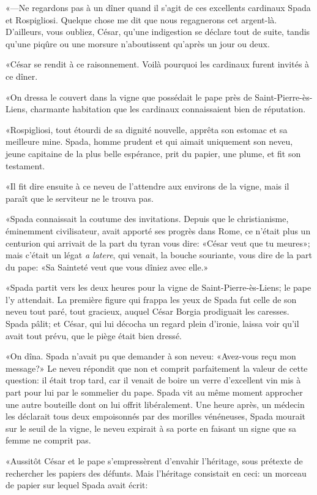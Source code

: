 «—Ne regardons pas à un dîner quand il s'agit de ces excellents cardinaux Spada et Rospigliosi. Quelque chose me dit que nous regagnerons cet argent-là. D'ailleurs, vous oubliez, César, qu'une indigestion se déclare tout de suite, tandis qu'une piqûre ou une morsure n'aboutissent qu'après un jour ou deux.

«César se rendit à ce raisonnement. Voilà pourquoi les cardinaux furent invités à ce dîner.

«On dressa le couvert dans la vigne que possédait le pape près de Saint-Pierre-ès-Liens, charmante habitation que les cardinaux connaissaient bien de réputation.

«Rospigliosi, tout étourdi de sa dignité nouvelle, apprêta son estomac et sa meilleure mine. Spada, homme prudent et qui aimait uniquement son neveu, jeune capitaine de la plus belle espérance, prit du papier, une plume, et fit son testament.

«Il fit dire ensuite à ce neveu de l'attendre aux environs de la vigne, mais il paraît que le serviteur ne le trouva pas.

«Spada connaissait la coutume des invitations. Depuis que le christianisme, éminemment civilisateur, avait apporté ses progrès dans Rome, ce n'était plus un centurion qui arrivait de la part du tyran vous dire: «César veut que tu meures»; mais c'était un légat \textit{a latere}, qui venait, la bouche souriante, vous dire de la part du pape: «Sa Sainteté veut que vous dîniez avec elle.»

«Spada partit vers les deux heures pour la vigne de Saint-Pierre-ès-Liens; le pape l'y attendait. La première figure qui frappa les yeux de Spada fut celle de son neveu tout paré, tout gracieux, auquel César Borgia prodiguait les caresses. Spada pâlit; et César, qui lui décocha un regard plein d'ironie, laissa voir qu'il avait tout prévu, que le piège était bien dressé.

«On dîna. Spada n'avait pu que demander à son neveu: «Avez-vous reçu mon message?» Le neveu répondit que non et comprit parfaitement la valeur de cette question: il était trop tard, car il venait de boire un verre d'excellent vin mis à part pour lui par le sommelier du pape. Spada vit au même moment approcher une autre bouteille dont on lui offrit libéralement. Une heure après, un médecin les déclarait tous deux empoisonnés par des morilles vénéneuses, Spada mourait sur le seuil de la vigne, le neveu expirait à sa porte en faisant un signe que sa femme ne comprit pas.

«Aussitôt César et le pape s'empressèrent d'envahir l'héritage, sous prétexte de rechercher les papiers des défunts. Mais l'héritage consistait en ceci: un morceau de papier sur lequel Spada avait écrit:

